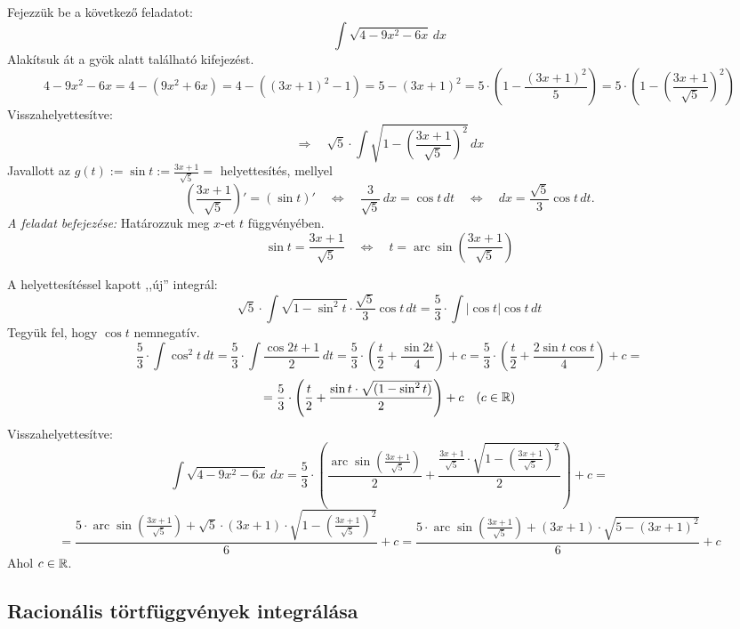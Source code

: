 \documentclass[a4paper,11.5pt]{article}
\DeclareMathOperator{\arc}{arc}
\begin{document}
	\begin{exercise}
		Fejezzük be a következő feladatot:
		\[ \int\sqrt{4-9x^2-6x}\,dx%
		\]
		Alakítsuk át a gyök alatt található kifejezést.
		\[ 4-9x^2-6x=4-(9x^2+6x)=4-((3x+1)^2-1)=5-(3x+1)^2=5\cdot\left(1-\frac{(3x+1)^2}{5}\right)=5\cdot\left(1-\left(\frac{3x+1}{\sqrt{5}}\right)^2\right)\]
		Visszahelyettesítve:
		\[\Rightarrow\quad \sqrt{5}\cdot\int\sqrt{1-\left(\frac{3x+1}{\sqrt{5}}\right)^2}\,dx \]
		Javallott az $\displaystyle g(t):=\sin t:=\frac{3x+1}{\sqrt{5}}=$ helyettesítés, mellyel
		\[ \left(\frac{3x+1}{\sqrt{5}}\right)'=(\sin t)'\quad  \Leftrightarrow\quad \frac{3}{\sqrt{5}}\,dx=\cos t\,dt\quad \Leftrightarrow\quad dx=\frac{\sqrt{5}}{3}\cos t\,dt. \]
		\textit{A feladat befejezése:}	Határozzuk meg $x$-et $t$ függvényében.
		\[ \sin t=\frac{3x+1}{\sqrt 5}\quad \Leftrightarrow\quad t = \arc\sin\left(\frac{3x+1}{\sqrt{5}}\right) \]
		
		A helyettesítéssel kapott ,,új'' integrál:
		\[ \sqrt{5}\cdot\int\sqrt{1-\sin^2t}\cdot\frac{\sqrt{5}}{3}\cos t\,dt=\frac{5}{3}\cdot\int|\cos t|\cos t\,dt\]
		Tegyük fel, hogy $\cos t$ nemnegatív.
		\[ \frac{5}{3}\cdot\int\cos^2 t\,dt=\frac{5}{3}\cdot\int\frac{\cos2t+1}{2}\,dt=\frac{5}{3}\cdot\left(\frac{t}{2}+\frac{\sin2t}{4}\right)+c=\frac{5}{3}\cdot\left(\frac{t}{2}+\frac{2\sin t\cos t}{4}\right)+c= \]
		\[ =\frac{5}{3}\cdot\left(\frac{t}{2}+\frac{\sin t\cdot\sqrt{(1-\sin^2t)}}{2}\right)+c \quad (c\in\mathbb{R})\]
		Visszahelyettesítve:
		\[ \int\sqrt{4-9x^2-6x}\,dx=\frac{5}{3}\cdot\left(\frac{\arc\sin\left(\frac{3x+1}{\sqrt 5}\right)}{2}+\frac{\frac{3x+1}{\sqrt{5}}\cdot\sqrt{1-\left(\frac{3x+1}{\sqrt{5}}\right)^2}}{2}\right)+c=\]
		\[ =\frac{5\cdot\arc\sin\left(\frac{3x+1}{\sqrt 5}\right)+\sqrt{5}\cdot(3x+1)\cdot\sqrt{1-\left(\frac{3x+1}{\sqrt{5}}\right)^2}}{6}+c=\frac{5\cdot\arc\sin\left(\frac{3x+1}{\sqrt 5}\right)+(3x+1)\cdot\sqrt{5-(3x+1)^2}}{6}+c \]
		Ahol $c\in\mathbb{R}$.
	\end{exercise}
	\subsection{Racionális törtfüggvények integrálása}
\end{document}
